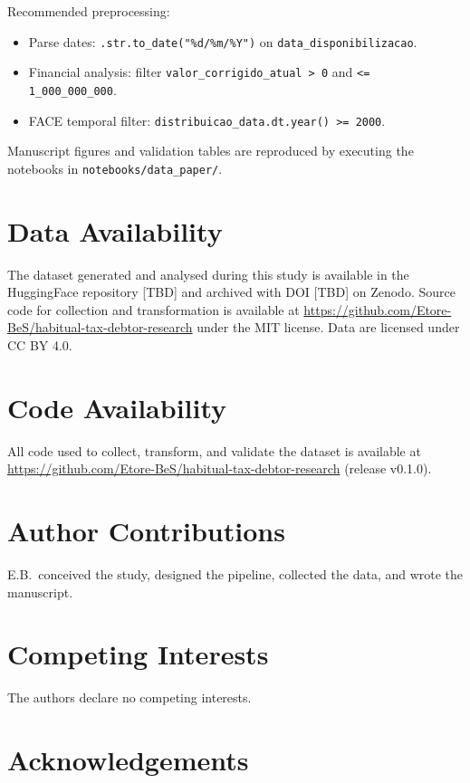 \documentclass[11pt,a4paper]{article}
\begin{document}
Recommended preprocessing:
\begin{itemize}
  \item Parse dates: \texttt{.str.to\_date("\%d/\%m/\%Y")} on \texttt{data\_disponibilizacao}.
  \item Financial analysis: filter \texttt{valor\_corrigido\_atual > 0} and \texttt{<= 1\_000\_000\_000}.
  \item FACE temporal filter: \texttt{distribuicao\_data.dt.year() >= 2000}.
\end{itemize}

Manuscript figures and validation tables are reproduced by executing the notebooks in \texttt{notebooks/data\_paper/}.

\section*{Data Availability}

The dataset generated and analysed during this study is available in the HuggingFace repository [TBD] and archived with DOI [TBD] on Zenodo. Source code for collection and transformation is available at \url{https://github.com/Etore-BeS/habitual-tax-debtor-research} under the MIT license. Data are licensed under CC BY 4.0.

\section*{Code Availability}

All code used to collect, transform, and validate the dataset is available at \url{https://github.com/Etore-BeS/habitual-tax-debtor-research} (release v0.1.0).

\section*{Author Contributions}

E.B.\ conceived the study, designed the pipeline, collected the data, and wrote the manuscript.

\section*{Competing Interests}

The authors declare no competing interests.

\section*{Acknowledgements}
\end{document}
